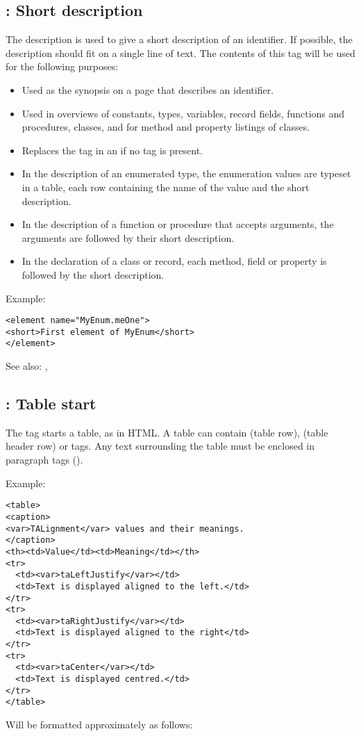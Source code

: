 \subsection{ : Short description}
\label{tag:short}
The  description is used to give a short description of an
identifier. If possible, the description should fit on a single line of
text. The contents of this tag will be used for the following purposes:
\begin{itemize}
\item Used as the synopsis on a page that describes an identifier.
\item Used in overviews of constants, types, variables, record fields, 
functions and procedures, classes, and for method and property listings of classes.
\item Replaces the  tag in an  if no  tag is present.
\item In the description of an enumerated type, the enumeration values are
typeset in a table, each row containing the name of the value and the short
description.
\item In the description of a function or procedure that accepts arguments,
the arguments are followed by their short description.
\item In the declaration of a class or record, each method, field or property
is followed by the short description.
\end{itemize}

Example:
\begin{verbatim}
<element name="MyEnum.meOne">
<short>First element of MyEnum</short>
</element>
\end{verbatim}

See also: , 

\subsection{ : Table start}
\label{tag:table}
The  tag starts a table, as in HTML. A table can contain
 (table row),   (table header row) or  tags.
Any text surrounding the table must be enclosed in paragraph tags ().

Example:
\begin{verbatim}
<table>
<caption>
<var>TALignment</var> values and their meanings.
</caption>
<th><td>Value</td><td>Meaning</td></th>
<tr>
  <td><var>taLeftJustify</var></td>
  <td>Text is displayed aligned to the left.</td>
</tr>
<tr>
  <td><var>taRightJustify</var></td>
  <td>Text is displayed aligned to the right</td>
</tr>
<tr>
  <td><var>taCenter</var></td>
  <td>Text is displayed centred.</td>
</tr>
</table>
\end{verbatim}
Will be formatted approximately as follows:


